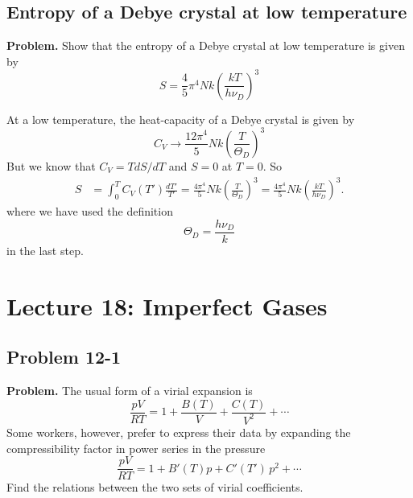 \documentclass[twocolumn, 10pt]{article}
\numberwithin{equation}{section}
\newenvironment{problem}
{\par\medskip\sffamily \color{problue}
  \textbf{Problem. }\ignorespaces}
{\medskip}
\newenvironment{solution}[1][\empty]
{\par\medskip
  \textbf{\ifx\empty#1{Solution.}\relax\else{#1}\fi} \ignorespaces}
{\medskip}
\begin{document}
\subsection{Entropy of a Debye crystal at low temperature}

\begin{problem}
  Show that the entropy of a Debye crystal at low
  temperature is given by
  $$
  S = \frac{4}{5} \pi^4 N k \left(\frac{kT}{h\nu_D}\right)^3
  $$
\end{problem}

\begin{solution}
  At a low temperature,
  the heat-capacity of a Debye crystal is given by
  \begin{equation}
    C_V \to \frac{ 12 \pi^4} { 5}
    N k \left( \frac{ T } { \Theta_D } \right)^3
    \tag{11-31}
  \end{equation}
  But we know that $C_V = TdS/dT$ and $S = 0$ at $T = 0$.
  So
  \begin{align*}
    S &= \int_0^T C_V(T') \frac{dT'}{T'}
    =
    \frac{ 4 \pi^4}{5}
    N k \left( \frac{T}{\Theta_D} \right)^3
    =
    \frac{ 4 \pi^4}{5}
    N k \left( \frac{k T}{h \nu_D} \right)^3
    .
  \end{align*}
  where we have used the definition
  \begin{equation}
    \Theta_D = \frac{ h \nu_D } { k}
    \tag{11-27}
  \end{equation}
  in the last step.
\end{solution}

\section{Lecture 18: Imperfect Gases}

\subsection{Problem 12-1}

\begin{problem}
  The usual form of a virial expansion is
  \begin{equation}
    \frac{pV}{RT}
    =
    1 + \frac{B(T)} {V} + \frac{C(T)}{V^2} + \cdots
    \label{eq:vir_invV}
  \end{equation}
  Some workers, however, prefer to express their data
  by expanding the compressibility factor
  in power series in the pressure
  $$
  \frac{ pV}{RT}
  =
  1+ B'(T) p + C'(T') \, p^2 + \cdots
  $$
  Find the relations between the two sets of virial coefficients.
\end{problem}
\end{document}
